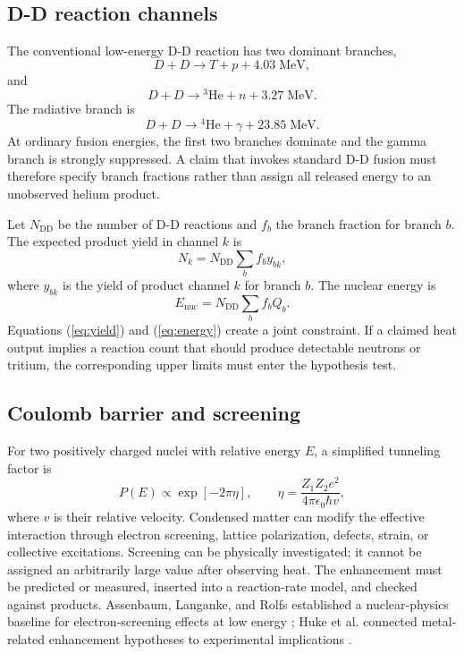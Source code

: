 \documentclass[conference]{IEEEtran}
\begin{document}
\subsection{D-D reaction channels}
The conventional low-energy D-D reaction has two dominant branches,
\begin{equation}
D+D\rightarrow T+p+4.03\;\mathrm{MeV},
\label{eq:ddt}
\end{equation}
and
\begin{equation}
D+D\rightarrow {}^3\mathrm{He}+n+3.27\;\mathrm{MeV}.
\label{eq:ddhe}
\end{equation}
The radiative branch is
\begin{equation}
D+D\rightarrow {}^4\mathrm{He}+\gamma+23.85\;\mathrm{MeV}.
\label{eq:ddgamma}
\end{equation}
At ordinary fusion energies, the first two branches dominate and the gamma branch is strongly suppressed. A claim that invokes standard D-D fusion must therefore specify branch fractions rather than assign all released energy to an unobserved helium product.

Let $N_{\mathrm{DD}}$ be the number of D-D reactions and $f_b$ the branch fraction for branch $b$. The expected product yield in channel $k$ is
\begin{equation}
N_k= N_{\mathrm{DD}}\sum_b f_b y_{bk},
\label{eq:yield}
\end{equation}
where $y_{bk}$ is the yield of product channel $k$ for branch $b$. The nuclear energy is
\begin{equation}
E_{\mathrm{nuc}}=N_{\mathrm{DD}}\sum_b f_b Q_b.
\label{eq:energy}
\end{equation}
Equations (\ref{eq:yield}) and (\ref{eq:energy}) create a joint constraint. If a claimed heat output implies a reaction count that should produce detectable neutrons or tritium, the corresponding upper limits must enter the hypothesis test.

\subsection{Coulomb barrier and screening}
For two positively charged nuclei with relative energy $E$, a simplified tunneling factor is
\begin{equation}
P(E)\propto \exp[-2\pi\eta],\qquad
\eta=\frac{Z_1Z_2e^2}{4\pi\epsilon_0\hbar v},
\label{eq:gamow}
\end{equation}
where $v$ is their relative velocity. Condensed matter can modify the effective interaction through electron screening, lattice polarization, defects, strain, or collective excitations. Screening can be physically investigated; it cannot be assigned an arbitrarily large value after observing heat. The enhancement must be predicted or measured, inserted into a reaction-rate model, and checked against products. Assenbaum, Langanke, and Rolfs established a nuclear-physics baseline for electron-screening effects at low energy \cite{assenbaum1987}; Huke et al. connected metal-related enhancement hypotheses to experimental implications \cite{huke2008}.
\end{document}
